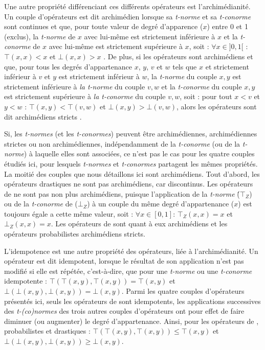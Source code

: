 Une autre propriété différenciant ces différents opérateurs est
l'archimédianité. Un couple d'opérateurs est dit archimédien lorsque
sa \emph{t-norme} et sa \emph{t-conorme} sont continues et que, pour
toute valeur de degré d’apparence (\(x\)) entre 0 et 1 (exclus), la
\emph{t-norme} de \(x\) avec lui-même est strictement inférieure à
\(x\) et la \emph{t-conorme} de \(x\) avec lui-même est strictement
supérieure à \(x\), soit : \(\forall x \in ]0,1[\) : \(⊤(x,x) < x\) et
\(⊥(x,x) > x\) \autocite{Bouchon-Meunier1995}. De plus, si les
opérateurs sont archimédiens et que, pour tous les degrés
d'appartenance \(x\), \(y\), \(v\) et \(w\) tels que \(x\) et
strictement inférieur à \(v\) et \(y\) est strictement inférieur à
\(w\), la \emph{t-norme} du couple \(x,y\) est strictement inférieure
à \emph{la t-norme} du couple \(v, w\) et la \emph{t-conorme} du
couple \(x,y\) est strictement supérieure à \emph{la t-conorme} du
couple \(v, w\), soit : pour tout \(x < v\) et \(y < w\) :
\(⊤(x,y) < ⊤(v,w)\) et \(⊥(x,y) > ⊥(v,w)\), alors les opérateurs sont
dit archimédiens stricts \autocite{Bouchon-Meunier1995}.

Si, les \emph{t-normes} (et les \emph{t-conormes}) peuvent être
archimédiennes, archimédiennes strictes ou non archimédiennes,
indépendamment de la \emph{t-conorme} (ou de la \emph{t-norme}) à
laquelle elles sont associées, ce n'est pas le cas pour les quatre
couples étudiés ici, pour lesquels \emph{t-normes} et
\emph{t-conormes} partagent les mêmes propriétés. La moitié des
couples que nous détaillons ici sont archimédiens. Tout d'abord, les
opérateurs drastiques ne sont pas archimédiens, car discontinus. Les
opérateurs de \textcite{Zadeh1965} ne sont pas non plus archimédiens,
puisque l’application de la \emph{t-norme} (́\(⊤_Z\)) ou de la
\emph{t-conorme} de  (\(⊥_Z\)) à un couple du même degré
d'appartenance (\(x\)) est toujours égale a cette même valeur, soit :
\(∀ x ∈ [0,1]\): \(⊤_Z(x,x) = x\) et \(⊥_Z(x,x) = x\).
%
Les opérateurs de  sont quant à eux archimédiens et
les opérateurs probabilistes archimédiens stricts.

L’idempotence est une autre propriété des opérateurs, liée à
l'archimédianité. Un opérateur est dit idempotent, lorsque le résultat
de son application n'est pas modifié si elle est répétée,
c'est-à-dire, que pour une \emph{t-norme} ou une \emph{t-conorme}
idempotente : \(⊤(⊤(x,y), ⊤(x,y)) = ⊤(x,y)\) et
\(⊥(⊥(x,y),⊥(x,y)) = ⊥(x,y)\). Parmi les quatre couples d'opérateurs
présentés ici, seuls les opérateurs de  sont idempotents,
les applications successives des \emph{t-(co)normes} des trois autres
couples d'opérateurs ont pour effet de faire diminuer (ou augmenter)
le degré d'appartenance. Ainsi, pour les opérateurs de
, probabilistes et drastiques :
\(⊤(⊤(x,y), ⊤(x,y)) ≤ ⊤(x,y)\) et \(⊥(⊥(x,y),⊥(x,y)) ≥ ⊥(x,y)\).

